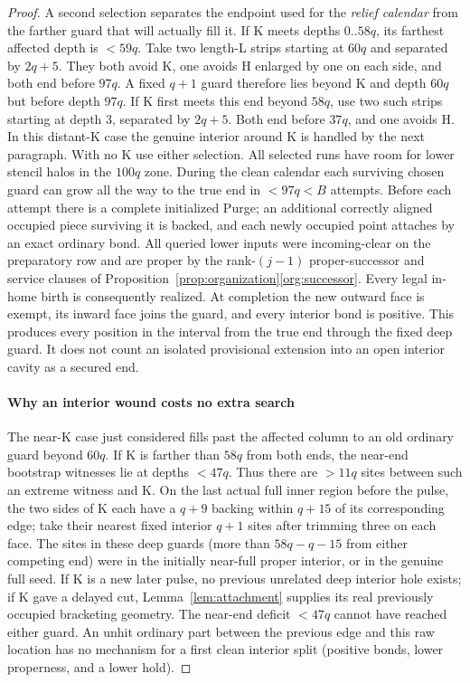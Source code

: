 \begin{proof}
A second selection separates the endpoint used for the \emph{relief calendar} from the farther guard that will actually fill it. If K meets depths 0.\(.58q\), its farthest affected depth is \(<59q\). Take two length-L strips starting at \(60q\) and separated by \(2q+5\). They both avoid K, one avoids H enlarged by one on each side, and both end before \(97q\). A fixed \(q+1\) guard therefore lies beyond K and depth \(60q\) but before depth \(97q\). If K first meets this end beyond \(58q\), use two such strips starting at depth 3, separated by \(2q+5\). Both end before \(37q\), and one avoids H. In this distant-K case the genuine interior around K is handled by the next paragraph. With no K use either selection. All selected runs have room for lower stencil halos in the \(100q\) zone. During the clean calendar each surviving chosen guard can grow all the way to the true end in \(<97q<B\) attempts. Before each attempt there is a complete initialized Purge; an additional correctly aligned occupied piece surviving it is backed, and each newly occupied point attaches by an exact ordinary bond. All queried lower inputs were incoming-clear on the preparatory row and are proper by the rank-\((j-1)\) proper-successor and service clauses of Proposition~\ref{prop:organization}\ref{org:successor}. Every legal in-home birth is consequently realized. At completion the new outward face is exempt, its inward face joins the guard, and every interior bond is positive. This produces every position in the interval from the true end through the fixed deep guard. It does not count an isolated provisional extension into an open interior cavity as a secured end.

\paragraph{Why an interior wound costs no extra search}

The near-K case just considered fills past the affected column to an old ordinary guard beyond \(60q\). If K is farther than \(58q\) from both ends, the near-end bootstrap witnesses lie at depths \(<47q\). Thus there are \(>11q\) sites between such an extreme witness and K. On the last actual full inner region before the pulse, the two sides of K each have a \(q+9\) backing within \(q+15\) of its corresponding edge; take their nearest fixed interior \(q+1\) sites after trimming three on each face. The sites in these deep guards (more than \(58q- q- 15\) from either competing end) were in the initially near-full proper interior, or in the genuine full seed. If K is a new later pulse, no previous unrelated deep interior hole exists; if K gave a delayed cut, Lemma~\ref{lem:attachment} supplies its real previously occupied bracketing geometry. The near-end deficit \(<47q\) cannot have reached either guard. An unhit ordinary part between the previous edge and this raw location has no mechanism for a first clean interior split (positive bonds, lower properness, and a lower hold).


\end{proof}
